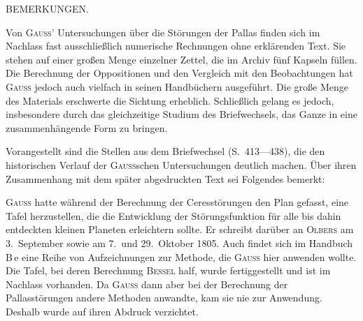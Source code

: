 \clearpage
\begingroup
{}
\renewcommand{\headrulewidth}{0pt}
\begin{center}\large BEMERKUNGEN.\end{center}
\begingroup
\newcommand{\BIntroJ}{\text{\mdseries\AstroSymbols ♃}}
\newcommand{\BIntroP}{\text{\mdseries\AstroSymbols ⚴}}

\par\noindent\hspace*{\parindent}Von \textsc{Gauss}’ Untersuchungen über die Störungen der Pallas finden sich im Nachlass fast ausschließlich
numerische Rechnungen ohne erklärenden Text. Sie stehen auf einer großen Menge einzelner Zettel,
die im Archiv fünf Kapseln füllen. Die Berechnung der Oppositionen und den Vergleich mit den
Beobachtungen hat \textsc{Gauss} jedoch auch vielfach in seinen Handbüchern ausgeführt. Die große Menge des
Materials erschwerte die Sichtung erheblich. Schließlich gelang es jedoch, insbesondere durch das gleichzeitige
Studium des Briefwechsels, das Ganze in eine zusammenhängende Form zu bringen.

\par\noindent\hspace*{\parindent}Vorangestellt sind die Stellen aus dem Briefwechsel (S.~413—438), die den
historischen Verlauf der \textsc{Gauss}schen Untersuchungen deutlich machen. Über ihren Zusammenhang mit dem später
abgedruckten Text sei Folgendes bemerkt:

\medskip
\par\noindent\hspace*{\parindent}\textsc{Gauss} hatte während der Berechnung der Ceresstörungen den Plan gefasst, eine Tafel herzustellen,
die die Entwicklung der Störungsfunktion für alle bis dahin entdeckten kleinen Planeten
erleichtern sollte. Er schreibt darüber an \textsc{Olbers} am 3.~September sowie am 7.~und 29.~Oktober 1805. Auch findet
sich im Handbuch B\,e eine Reihe von Aufzeichnungen zur Methode, die \textsc{Gauss} hier anwenden wollte.
Die Tafel, bei deren Berechnung \textsc{Bessel} half, wurde fertiggestellt und ist im Nachlass vorhanden.
Da \textsc{Gauss} dann aber bei der Berechnung der Pallasstörungen andere Methoden anwandte,
kam sie nie zur Anwendung. Deshalb wurde auf ihren Abdruck verzichtet.

